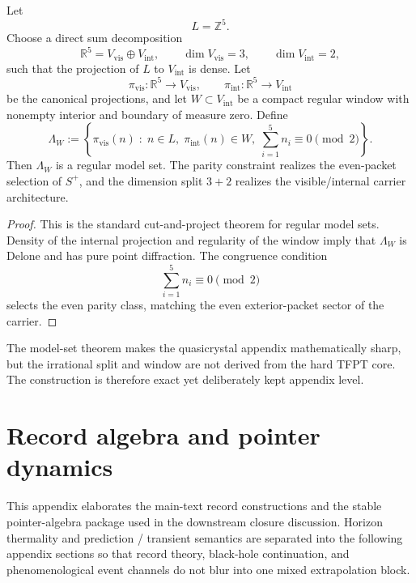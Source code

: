 \begin{theorem}
\label{thm:cut-project-model-set}
Let
\[
L=\mathbb Z^5.
\]
Choose a direct sum decomposition
\[
\mathbb R^5=V_{\mathrm{vis}}\oplus V_{\mathrm{int}},
\qquad
\dim V_{\mathrm{vis}}=3,
\qquad
\dim V_{\mathrm{int}}=2,
\]
such that the projection of $L$ to $V_{\mathrm{int}}$ is dense. Let
\[
\pi_{\mathrm{vis}}:\mathbb R^5\to V_{\mathrm{vis}},
\qquad
\pi_{\mathrm{int}}:\mathbb R^5\to V_{\mathrm{int}}
\]
be the canonical projections, and let $W\subset V_{\mathrm{int}}$ be a compact regular window with
nonempty interior and boundary of measure zero. Define
\[
\Lambda_W
:=
\left\{
\pi_{\mathrm{vis}}(n)\;:\;
n\in L,\;
\pi_{\mathrm{int}}(n)\in W,\;
\sum_{i=1}^5 n_i\equiv 0\!\!\!\pmod 2
\right\}.
\]
Then $\Lambda_W$ is a regular model set. The parity constraint realizes the even-packet selection of
$S^+$, and the dimension split $3+2$ realizes the visible/internal carrier architecture.
\end{theorem}

\begin{proof}
This is the standard cut-and-project theorem for regular model sets. Density of the internal
projection and regularity of the window imply that $\Lambda_W$ is Delone and has pure point
diffraction. The congruence condition
\[
\sum_{i=1}^5 n_i\equiv 0\!\!\!\pmod 2
\]
selects the even parity class, matching the even exterior-packet sector of the carrier.
\end{proof}

\begin{remark}
The model-set theorem makes the quasicrystal appendix mathematically sharp, but the irrational split
and window are not derived from the hard TFPT core. The construction is therefore exact yet
deliberately kept appendix level.
\end{remark}

\section{Record algebra and pointer dynamics}
\label{app:record}

This appendix elaborates the main-text record constructions and the stable pointer-algebra package
used in the downstream closure discussion. Horizon thermality and prediction / transient semantics
are separated into the following appendix sections so that record theory, black-hole continuation,
and phenomenological event channels do not blur into one mixed extrapolation block.

